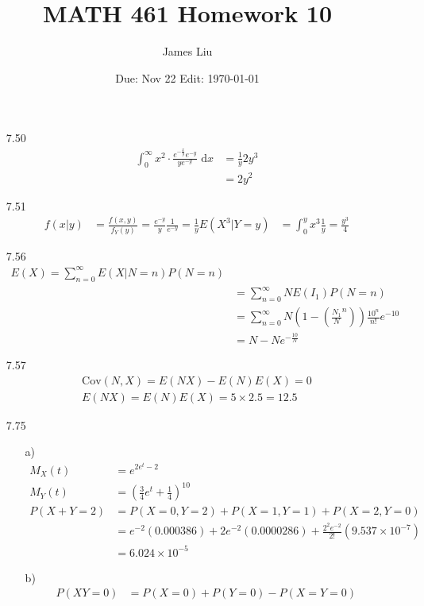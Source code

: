 \documentclass{article}
\date{Due: Nov 22 Edit: \today}
\title{MATH 461 Homework 10}
\author{James Liu}
\begin{document}
\maketitle
\begin{itemize}
    \item [7.50]
    \begin{align*}
        \int_{0}^{\infty}x^2\cdot \frac{e^{-\frac{x}{y}}e^{-y}}{ye^{-y}}\text{ d}x
        &=\frac{1}{ y}2y^3\\
        &=2y^2
    \end{align*}
    \item [7.51]
    \begin{align*}
        f(x|y)&=\frac{f(x,y)}{f_Y(y)}=\frac{e^{-y}}{y}\frac{1}{e^{-y}}=\frac{1}{y}
        E(X^3|Y=y)&=\int_{0}^{y}x^3\frac{1}{y}=\frac{y^3}{4}
    \end{align*}
    \item [7.56]
    \begin{align*}
        E(X)=\sum_{n=0}^{\infty}E(X|N=n)P(N=n)\\
        &=\sum_{n=0}^{\infty}NE(I_1)P(N=n)\\
        &=\sum_{n=0}^{\infty}N(1-\left(\frac{N_1}{N}^n\right))\frac{10^n}{n!}e^{-10}\\
        &=N-Ne^{-\frac{10}{N}}
    \end{align*}
    \item [7.57]
    \begin{align*}
        \text{Cov}(N,X)=E(NX)-E(N)E(X)=0\\
        E(NX)=E(N)E(X)=5\times 2.5=12.5
    \end{align*}
    \item [7.75]
    \begin{itemize}
        \item [a)]
        \begin{align*}
            M_X(t)&=e^{2e^t-2}\\
            M_Y(t)&=\left(\frac{3}{4}e^t+\frac{1}{4}\right)^{10}\\
            P(X+Y=2)&=P(X=0,Y=2)+P(X=1,Y=1)+P(X=2,Y=0)\\
            &=e^{-2}(0.000386)+2e^{-2}(0.0000286)+\frac{2^2e^{-2}}{2!}(9.537\times 10^{-7})\\
            &=6.024\times 10^{-5}
        \end{align*}
        \item [b)]
        \begin{align*}
            P(XY=0)&=P(X=0)+P(Y=0)-P(X=Y=0)\\

\end{align*}
\end{itemize}
\end{itemize}
\end{document}
